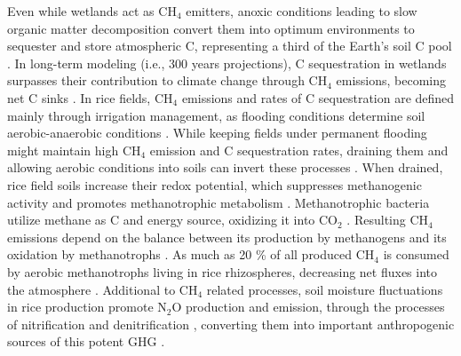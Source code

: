 Even while wetlands act as CH$_{4}$ emitters, anoxic conditions leading to slow organic matter decomposition convert them into optimum environments to sequester and store atmospheric C, representing a third of the Earth's soil C pool \citep{gorham1991northern, arai2024}. In long-term modeling (i.e., 300 years projections), C sequestration in wetlands surpasses their contribution to climate change through CH$_{4}$ emissions, becoming net C sinks \citep{mitsch2013a}. In rice fields, CH$_{4}$ emissions and rates of C sequestration are defined mainly through irrigation management, as flooding conditions determine soil aerobic-anaerobic conditions \citep{maneepitak2019}. While keeping fields under permanent flooding might maintain high CH$_{4}$ emission and C sequestration rates, draining them and allowing aerobic conditions into soils can invert these processes \citep{carrijo2017, arai2024}. When drained, rice field soils increase their redox potential, which suppresses methanogenic activity and promotes methanotrophic metabolism \citep{pandey2014}. Methanotrophic bacteria utilize methane as C and energy source, oxidizing it into CO$_{2}$ \citep{ma2013}. Resulting CH$_{4}$ emissions depend on the balance between its production by methanogens and its oxidation by methanotrophs \citep{malyan2021a}. As much as 20 \% of all produced CH$_{4}$ is consumed by aerobic methanotrophs living in rice rhizospheres, decreasing net fluxes into the atmosphere \citep{frenzel2000}. Additional to CH$_{4}$ related processes, soil moisture fluctuations in rice production promote N$_{2}$O production and emission, through the processes of nitrification and denitrification \citep{banerjee2016}, converting them into important anthropogenic sources of this potent GHG \citep{cai1997methane}.\\

